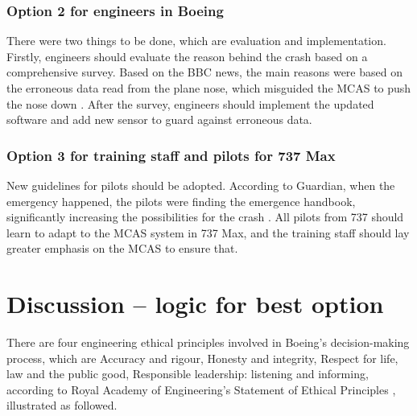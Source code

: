 \documentclass{article}
\begin{document}
\subsubsection{Option 2 for engineers in Boeing}
There were two things to be done, which are evaluation and implementation. Firstly, engineers should evaluate the reason behind the crash based on a comprehensive survey. Based on the BBC news, the main reasons were based on the erroneous data read from the plane nose, which misguided the MCAS to push the nose down \cite{Therealr56:online}. After the survey, engineers should implement the updated software and add new sensor to guard against erroneous data.

\subsubsection{Option 3 for training staff and pilots for 737 Max}
New guidelines for pilots should be adopted. According to Guardian, when the emergency happened, the pilots were finding the emergence handbook, significantly increasing the possibilities for the crash \cite{LionAirp71:online}. All pilots from 737 should learn to adapt to the MCAS system in 737 Max, and the training staff should lay greater emphasis on the MCAS to ensure that. 
\section{Discussion – logic for best option} 
There are four engineering ethical principles involved in Boeing's decision-making process, which are Accuracy and rigour, Honesty and integrity, Respect for life, law and the public good, Responsible leadership: listening and informing, according to Royal Academy of Engineering’s Statement of Ethical Principles \cite{statemen88:online}, illustrated as followed. 
\end{document}

